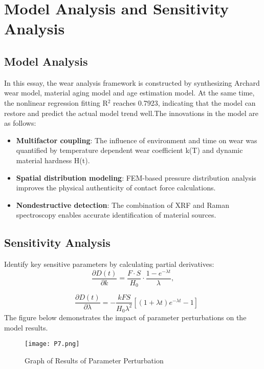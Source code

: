 \documentclass{mcmthesis}
\begin{document}


\section{Model Analysis and Sensitivity Analysis}

\subsection{Model Analysis}
\hspace{1.5em}In this essay, the wear analysis framework is constructed by synthesizing Archard wear model, material aging model and age estimation model. At the same time, the nonlinear regression fitting R$^2$ reaches 0.7923, indicating that the model can restore and predict the actual model trend well.The innovations in the model are as follows:
 
\begin{itemize}
\item \textbf{Multifactor coupling}: The influence of environment and time on wear was quantified by temperature dependent wear coefficient k(T) and dynamic material hardness H(t).
\item \textbf{Spatial distribution modeling}: FEM-based pressure distribution analysis improves the physical authenticity of contact force calculations.
\item \textbf{Nondestructive detection}: The combination of XRF and Raman spectroscopy enables accurate identification of material sources.
\end{itemize}

\subsection{Sensitivity Analysis}
\hspace{1.5em}Identify key sensitive parameters by calculating partial derivatives:
\begin{equation}
\frac{\partial D(t)}{\partial k} = \frac{F \cdot S}{H_0} \cdot \frac{1 - e^{-\lambda t}}{\lambda},
\end{equation}

\begin{equation}
\quad \frac{\partial D(t)}{\partial \lambda} = -\frac{k F S}{H_0 \lambda^2} \left[ (1 + \lambda t)e^{-\lambda t} - 1 \right]
\end{equation}
\hspace{1.5em}The figure below demonstrates the impact of parameter perturbations on the model results.
\newpage
\begin{figure}[htp]
    \centering
    \texttt{[image: P7.png]}
    \caption{Graph of Results of Parameter Perturbation}
\end{figure}
\end{document}
